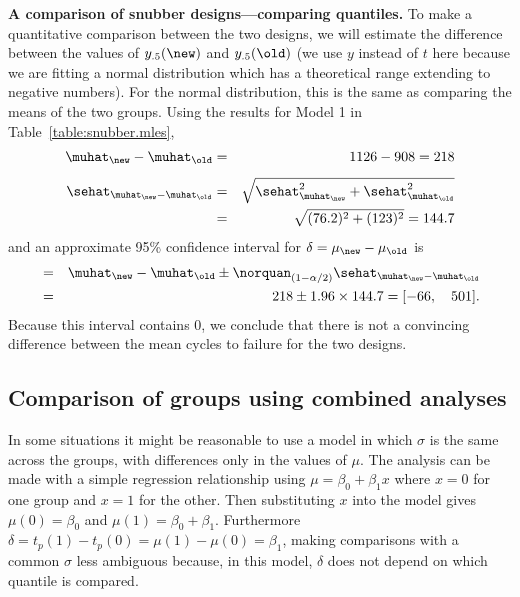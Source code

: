 \begin{example}
\label{example:snubber.comparing.quantiles}
{\bf A comparison of snubber designs---comparing quantiles.} To make a
quantitative comparison between the two designs, we will estimate the
difference between the values of $y_{.5}(\new)$ and
$y_{.5}(\old)$ (we use $y$ instead of $t$ here because we are
fitting a normal distribution which has a theoretical range extending
to negative numbers). For the normal distribution, this is the same as
comparing the means of the two groups.
Using the results for Model 1 in Table~\ref{table:snubber.mles},
\begin{eqnarray*}
\muhat_{\new} - \muhat_{\old} & = & 1126 - 908 = 218\\[1ex]
\sehat_{\muhat_{\new} - \muhat_{\old}} &=&
\sqrt{\sehat^{2}_{\muhat_{\new}} + \sehat^{2}_{\muhat_{\old}}}
\\
  & = & \sqrt{(76.2)^{2} +  (123)^{2}   } = 144.7
\end{eqnarray*}
and an approximate 95\% confidence interval for
$\delta = \mu_{\new} -
\mu_{\old}$ is
\begin{eqnarray*}
[\undertilde{\delta}, \quad \tilde{\delta}] &=& 
	\muhat_{\new} - \muhat_{\old} \pm 
     \norquan_{(1-\alpha/2)} \sehat_{\muhat_{\new} -
\muhat_{\old}}\\
	&=& 218 \pm 1.96 \times 144.7 = [-66, \quad 501].
\end{eqnarray*}
Because this interval contains 0, we conclude that there is
not a convincing difference
between the mean cycles to failure for the two designs.
\end{example}

\subsection{Comparison of groups using combined analyses}
In some situations it might be reasonable to use a model in which 
$\sigma$ is the same across the groups, with differences only in the
values of $\mu$. 
The analysis can be made with a simple regression relationship using
$\mu=\beta_{0}+\beta_{1} x$ where
$x=0$ for one group and $x=1$ for the other. Then substituting $x$ into
the model gives $\mu(0)=\beta_{0}$ and
$\mu(1)=\beta_{0}+\beta_{1}$.
Furthermore $\delta = t_{p}(1) -t_{p}(0)=\mu(1) -
\mu(0) = \beta_{1}$, making comparisons with a common $\sigma$
less ambiguous because, in this model, $\delta$ does not depend on 
which quantile is compared.

